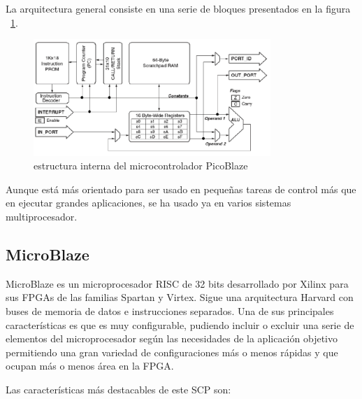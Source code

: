 	La arquitectura general consiste en una serie de bloques presentados en la figura ~\ref{fig:PicoBlazer}.
		
	\begin{figure}[h!]
 	\begin{center}
  	\includegraphics[width=0.8\textwidth,keepaspectratio=true]{./images/estructurapico}
  	\caption{estructura interna del microcontrolador PicoBlaze}
  	\label{fig:PicoBlazer}
 	\end{center}
	\end{figure}

Aunque está más orientado para ser usado en pequeñas tareas de control más que en ejecutar grandes aplicaciones, se ha usado ya en varios sistemas multiprocesador.

	\subsection{MicroBlaze}

MicroBlaze es un microprocesador RISC de 32 bits desarrollado por Xilinx para sus FPGAs de las familias Spartan y Virtex. Sigue una arquitectura Harvard con buses de memoria de datos e instrucciones separados. Una de sus principales características es que es muy configurable, pudiendo incluir o excluir una serie de elementos del microprocesador según las necesidades de la aplicación objetivo permitiendo una gran variedad de configuraciones más o menos rápidas y que ocupan más o menos área en la FPGA.

Las características más destacables de este SCP son:    


